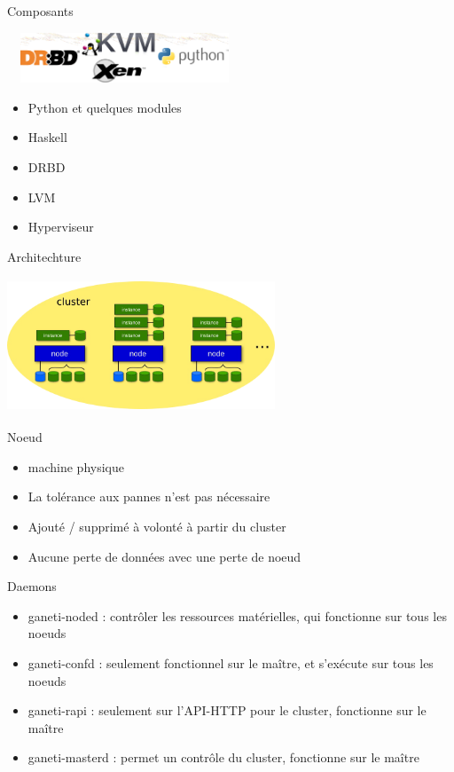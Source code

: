 \begin{frame}{Composants}
\begin{center}
  \includegraphics[width=7cm,height=1.5cm]{images_presentation/module.png}
\end{center}
\begin{itemize}
\item Python et quelques modules
\item Haskell
\item DRBD
\item LVM
\item Hyperviseur
\end{itemize}
\end{frame}

\begin{frame}{Architechture}
\begin{center}
  \includegraphics[width=8cm,height=4cm]{images_presentation/archi1.png}
\end{center}
\end{frame}

\begin{frame}{Noeud}
\begin{itemize}
\item machine physique
\pause
\item La tolérance aux pannes n'est pas nécessaire
\pause
\item Ajouté / supprimé à volonté à partir du cluster
\pause
\item Aucune perte de données avec une perte de noeud
\end{itemize}
\end{frame}

\begin{frame}{Daemons}
\begin{itemize}
\item ganeti-noded : contrôler les ressources matérielles, qui fonctionne sur tous les noeuds
\pause
\item ganeti-confd : seulement fonctionnel sur le maître, et s'exécute sur tous les noeuds
\pause
\item ganeti-rapi : seulement sur l'API-HTTP  pour le cluster, fonctionne sur le maître
\pause
\item ganeti-masterd :  permet un contrôle du cluster, fonctionne sur le maître
\end{itemize}
\end{frame}

